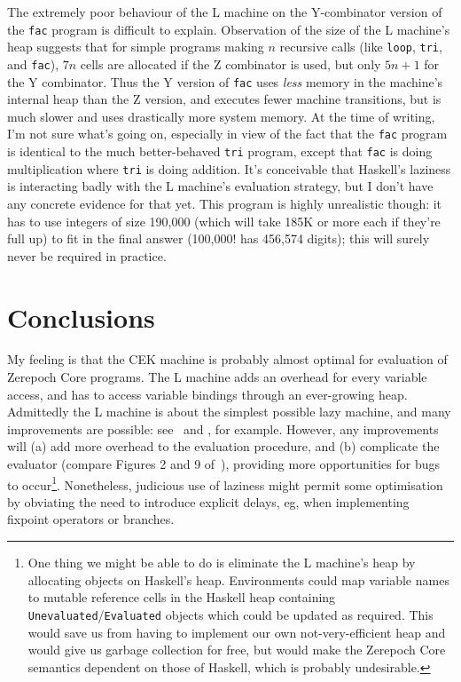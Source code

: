 \documentclass[a4paper]{article}
\begin{document}
The extremely poor behaviour of the L machine on the Y-combinator
version of the \texttt{fac} program is difficult to explain.
Observation of the size of the L machine's heap suggests that for
simple programs making $n$ recursive calls (like \texttt{loop},
\texttt{tri}, and \texttt{fac}), $7n$ cells are allocated if the Z
combinator is used, but only $5n+1$ for the Y combinator.  Thus the Y
version of \texttt{fac} uses \textit{less} memory in the machine's
internal heap than the Z version, and executes fewer machine
transitions, but is much slower and uses drastically more system
memory.  At the time of writing, I'm not sure what's going on,
especially in view of the fact that the \texttt{fac} program is
identical to the much better-behaved \texttt{tri} program, except that
\texttt{fac} is doing multiplication where \texttt{tri} is doing
addition.  It's conceivable that Haskell's laziness is interacting badly
with the L machine's evaluation strategy, but I don't have any
concrete evidence for that yet.  This program is highly unrealistic
though: it has to use integers of size 190,000 (which will take 185K
or more each if they're full up) to fit in the final answer (100,000!
has 456,574 digits); this will surely never be required in practice.

\section{Conclusions}
My feeling is that the CEK machine is probably almost optimal for
evaluation of Zerepoch Core programs.  The L machine adds an overhead
for every variable access, and has to access variable bindings through
an ever-growing heap.  Admittedly the L machine is about the simplest
possible lazy machine, and many improvements are possible:
see~\cite{Sestoft} and \cite{Friedman}, for example.  However, any
improvements will (a) add more overhead to the evaluation procedure,
and (b) complicate the evaluator (compare Figures 2 and 9
of~\cite{Friedman}), providing more opportunities for bugs to 
occur\footnote{
  One thing we might be able to do is eliminate the L
  machine's heap by allocating objects on Haskell's heap.
  Environments could map variable names to mutable reference cells in
  the Haskell heap containing \texttt{Unevaluated}/\texttt{Evaluated}
  objects which could be updated as required. This would save us from
  having to implement our own not-very-efficient heap and would give
  us garbage collection for free, but would make the Zerepoch Core
  semantics dependent on those of Haskell, which is probably
  undesirable.}.
Nonetheless, judicious use of laziness might permit some optimisation
by obviating the need to introduce explicit delays, eg, when
implementing fixpoint operators or branches.
\end{document}
